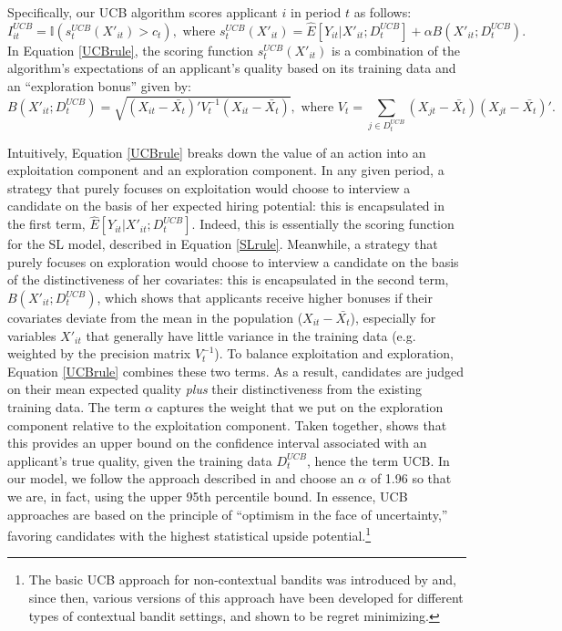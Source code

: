 \documentclass[crop,noquery,editorname,historyrev,nosurname,runningno,sepcount]{RESTUD}
\begin{document}
Specifically, our UCB algorithm scores applicant $i$ in period $t$ as follows:
\begin{equation} \label{UCBrule}
I_{it}^{UCB}=\mathbb{I}(s_t^{UCB}(X'_{it})>c_t), \text{ where } s_t^{UCB}(X'_{it})=\hat{E}[Y_{it}|X'_{it}; D^{UCB}_{t}] + \alpha B(X'_{it}; D^{UCB}_{t}).
\end{equation}
In Equation \eqref{UCBrule}, the scoring function $s_t^{UCB}(X'_{it})$ is a combination of the algorithm's expectations of an applicant's quality based on its training data and an ``exploration bonus'' given by:
\begin{equation} \label{UCBBonus} 
B(X'_{it}; D^{UCB}_{t}) = \sqrt{(X_{it}-\bar{X_t})'V_t^{-1}(X_{it}-\bar{X_t})}, \text{ where } V_t  = \sum_{j \in D^{UCB}_{t}} (X_{jt}-\bar{X_t})(X_{jt}-\bar{X_t})'.
\end{equation}

Intuitively, Equation \eqref{UCBrule} breaks down the value of an action into an exploitation component and an exploration component.  In any given period, a strategy that purely focuses on exploitation would choose to interview a candidate on the basis of her expected hiring potential: this is encapsulated in the first term, $\hat{E}[Y_{it}|X'_{it}; D_t^{UCB}]$. Indeed, this is essentially the scoring function for the SL model, described in Equation \eqref{SLrule}.  Meanwhile, a strategy that purely focuses on exploration would choose to interview a candidate on the basis of the distinctiveness of her covariates: this is encapsulated in the second term, $B(X'_{it}; D_t^{UCB})$, which shows that applicants receive higher bonuses if their covariates deviate from the mean in the population ($X_{it}-\bar{X_t}$), especially for variables $X'_{it}$ that generally have little variance in the training data (e.g. weighted by the precision matrix $V_t^{-1}$).  To balance exploitation and exploration, Equation \eqref{UCBrule} combines these two terms.  As a result, candidates are judged on their mean expected quality \textit{plus} their distinctiveness from the existing training data.  The term $\alpha$ captures the weight that we put on the exploration component relative to the exploitation component.  Taken together, \citet{li2017} shows that this provides an upper bound on the confidence interval associated with an applicant's true quality, given the training data $D_t^{UCB}$, hence the term UCB.  In our model, we follow the approach described in \citet{li2017} and choose an $\alpha$ of 1.96 so that we are, in fact, using the upper 95th percentile bound. 
In essence, UCB approaches are based on the principle of ``optimism in the face of uncertainty,'' favoring candidates with the highest statistical upside potential.\footnote{The basic UCB approach for non-contextual bandits was introduced by \citet{lai1985} and, since then, various versions of this approach have been developed for different types of contextual bandit settings, and shown to be regret minimizing.}
\end{document}
